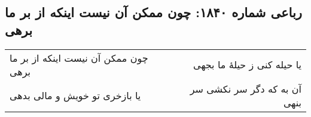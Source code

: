 \begin{center}
\section*{رباعی شماره ۱۸۴۰: چون ممکن آن نیست اینکه از بر ما برهی}
\label{sec:1840}
\begin{longtable}{l p{0.5cm} r}
چون ممکن آن نیست اینکه از بر ما برهی
&&
یا حیله کنی ز حیلهٔ ما بجهی
\\
یا بازخری تو خویش و مالی بدهی
&&
آن به که دگر سر نکشی سر بنهی
\\
\end{longtable}
\end{center}
